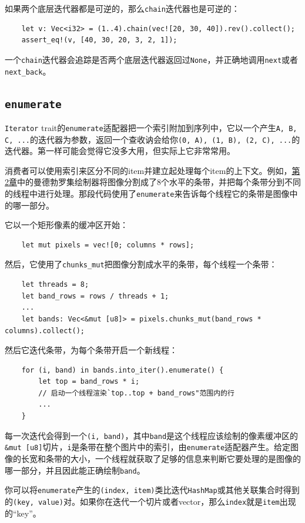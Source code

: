 如果两个底层迭代器都是可逆的，那么\texttt{chain}迭代器也是可逆的：
\begin{verbatim}
    let v: Vec<i32> = (1..4).chain(vec![20, 30, 40]).rev().collect();
    assert_eq!(v, [40, 30, 20, 3, 2, 1]);
\end{verbatim}

一个\texttt{chain}迭代器会追踪是否两个底层迭代器返回过\texttt{None}，并正确地调用\texttt{next}或者\texttt{next\_back}。

\subsection{\texttt{enumerate}}\label{enumerate}
\texttt{Iterator} trait的\texttt{enumerate}适配器把一个索引附加到序列中，它以一个产生\texttt{A, B, C, ...}的迭代器为参数，返回一个查收讷会给你\texttt{(0, A), (1, B), (2, C), ...}的迭代器。第一样可能会觉得它没多大用，但实际上它非常常用。

消费者可以使用索引来区分不同的item并建立起处理每个item的上下文。例如，\hyperref[ch02]{第2章}中的曼德勃罗集绘制器将图像分割成了8个水平的条带，并把每个条带分到不同的线程中进行处理。那段代码使用了\texttt{enumerate}来告诉每个线程它的条带是图像中的哪一部分。

它以一个矩形像素的缓冲区开始：
\begin{verbatim}
    let mut pixels = vec![0; columns * rows];
\end{verbatim}
然后，它使用了\texttt{chunks\_mut}把图像分割成水平的条带，每个线程一个条带：
\begin{verbatim}
    let threads = 8;
    let band_rows = rows / threads + 1;
    ...
    let bands: Vec<&mut [u8]> = pixels.chunks_mut(band_rows * columns).collect();
\end{verbatim}

然后它迭代条带，为每个条带开启一个新线程：
\begin{verbatim}
    for (i, band) in bands.into_iter().enumerate() {
        let top = band_rows * i;
        // 启动一个线程渲染`top..top + band_rows"范围内的行
        ...
    }
\end{verbatim}

每一次迭代会得到一个\texttt{(i, band)}，其中\texttt{band}是这个线程应该绘制的像素缓冲区的\texttt{\&mut [u8]}切片，\texttt{i}是条带在整个图片中的索引，由\texttt{enumerate}适配器产生。给定图像的长宽和条带的大小，一个线程就获取了足够的信息来判断它要处理的是图像的哪一部分，并且因此能正确绘制\texttt{band}。

你可以将\texttt{enumerate}产生的\texttt{(index, item)}类比迭代\texttt{HashMap}或其他关联集合时得到的\texttt{(key, value)}对。如果你在迭代一个切片或者vector，那么\texttt{index}就是\texttt{item}出现的“key”。

